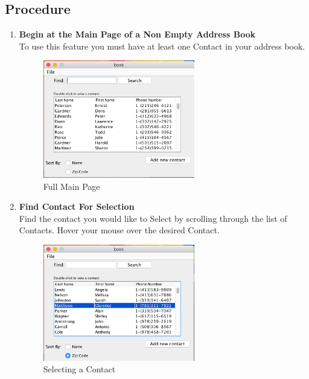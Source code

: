 \documentclass[a4paper, 11pt]{article}
\begin{document}
\subsection{Procedure}
\begin{enumerate}[label=\textbf{\arabic*})]
    \item{\textbf{Begin at the Main Page of a Non Empty Address Book}}\\ To use this feature you must have at least one Contact in your address book.
    
    \begin{figure}[h!]
    \centering
      \includegraphics[width=250]{main_page_full.png}
      \caption{Full Main Page}
    \end{figure}
    
    \item{\textbf{Find Contact For Selection}}\\ Find the contact you would like to Select by scrolling through the list of Contacts. Hover your mouse over the desired Contact. 
    
    \begin{figure}[h!]
    \centering
      \includegraphics[width=250]{main_screen_select.png}
      \caption{Selecting a Contact}
    \end{figure}
    

\end{enumerate}
\end{document}
